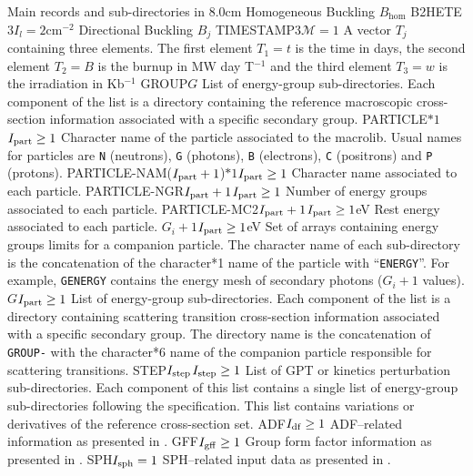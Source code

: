 \begin{DescriptionEnregistrement}{Main records and sub-directories in }{8.0cm}
  {Homogeneous Buckling $B_{\mathrm{hom}}$}
\OptRealEnr
  {B2HETE}{$3$}{$I_{l}=2$}{cm$^{-2}$}
  {Directional Buckling $B_{j}$}
\OptRealEnr
  {TIMESTAMP}{$3$}{$\mathcal{M}=1$}{}
  {A vector $T_{j}$ containing three elements. The first element $T_{1}=t$ is the time in days, the
   second element $T_{2}=B$ is the burnup in MW day T$^{-1}$ and the third element $T_{3}=w$ is the 
   irradiation in Kb$^{-1}$}
\DirlEnr
  {GROUP}{$G$}
  {List of energy-group sub-directories. Each component of the list is a directory containing
  the reference macroscopic cross-section information associated with a specific secondary group.}
\OptCharEnr
  {PARTICLE}{$*1$}{$I_{\rm part}\ge 1$} 
  {Character name of the particle associated to the macrolib. Usual names for
  particles are {\tt N} (neutrons), {\tt G} (photons), {\tt B} (electrons),
  {\tt C} (positrons) and {\tt P} (protons).}
\OptCharEnr
  {PARTICLE-NAM}{($I_{\rm part}+1$)$*1$}{$I_{\rm part}\ge 1$} 
  {Character name associated to each particle.}
\OptIntEnr
  {PARTICLE-NGR}{$I_{\rm part}+1$}{$I_{\rm part}\ge 1$}
  {Number of energy groups associated to each particle.}
\OptRealEnr
  {PARTICLE-MC2}{$I_{\rm part}+1$}{$I_{\rm part}\ge 1$}{eV}
  {Rest energy associated to each particle.}
\OptRealVar
  {}{$G_i+1$}{$I_{\rm part}\ge 1$}{eV}
  {Set of arrays containing energy groups limits for a companion particle. The character name
  of each sub-directory is the concatenation of the character*1 name of the particle with ``{\tt ENERGY}''.
  For example, {\tt GENERGY} contains the energy mesh of secondary photons ($G_i+1$ values).}
\OptDirlVar
  {}{$G$}{$I_{\rm part}\ge 1$} 
  {List of energy-group sub-directories. Each component of the list is a directory containing
  scattering transition cross-section information associated with a specific secondary group.
  The directory  name is the concatenation of {\tt GROUP-} with the character*6
  name of the companion particle responsible for scattering transitions.}
\OptDirlEnr
  {STEP}{$I_{\rm step}$}{$I_{\rm step}\ge 1$} 
  {List of GPT or kinetics perturbation sub-directories. Each component of
  this list contains a single 
  list of energy-group sub-directories following the  specification.
  This  list contains variations or derivatives of the reference cross-section set.}
\OptDirEnr
  {ADF}{$I_{\rm df} \ge 1$}
  {ADF--related information as presented in .}
\OptDirEnr
  {GFF}{$I_{\rm gff} \ge 1$}
  {Group form factor information as presented in .}
\OptDirEnr
  {SPH}{$I_{\rm sph} = 1$}
  {SPH--related input data as presented in .}
\end{DescriptionEnregistrement}

